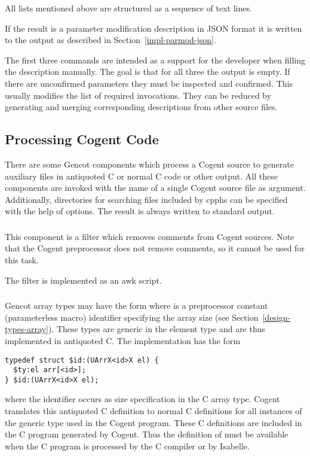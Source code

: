 All lists mentioned above are structured as a sequence of text lines.

If the result is a parameter modification description in JSON format it is written to the output as described in 
Section~\ref{impl-parmod-json}.

The first three commands are intended as a support for the developer when filling the description manually. The goal is that
for all three the output is empty. If there are unconfirmed parameters they must be inspected and confirmed. This usually 
modifies the list of required invocations. They can be reduced by generating and merging corresponding descriptions
from other source files.

\subsection{Processing Cogent Code}
\label{impl-ocomps-cogent}

There are some Gencot components which process a Cogent source to generate auxiliary files in antiquoted C or normal C code
or other output.
All these components are invoked with the name of a single Cogent source file as argument. Additionally, directories for
searching files included by cpphs can be specified with the help of  options. The result is always written to 
standard output.

\subsubsection{}

This component is a filter which removes comments from Cogent sources. Note that the Cogent preprocessor 
does not remove comments, so it cannot be used for this task.

The filter is implemented as an awk script.

\subsubsection{}

Gencot array types may have the form  where  is a preprocessor constant (parameterless macro) 
identifier specifying the array size (see Section~\ref{design-types-array}). These types are generic in the element type 
and are thus implemented in antiquoted C. The implementation has the form 
\begin{verbatim}
typedef struct $id:(UArrX<id>X el) {
  $ty:el arr[<id>];
} $id:(UArrX<id>X el);
\end{verbatim}
where the identifier  occurs as size specification in the C array type. Cogent translates this antiquoted 
C definition to normal C definitions for all instances of the generic type used in the Cogent program. These C definitions
are included in the C program generated by Cogent.
Thus the definition of  must be available when the C program is processed by the C compiler or by Isabelle.

